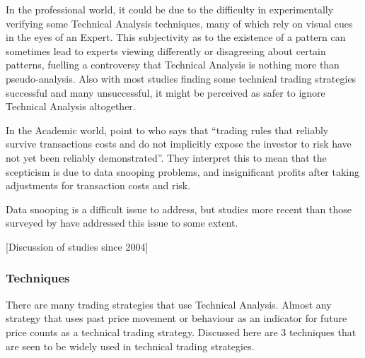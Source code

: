 \documentclass{article}
\theoremstyle{definition}
\begin{document}
In the professional world, it could be due to the difficulty in experimentally verifying some Technical Analysis techniques, many of which rely on visual cues in the eyes of an Expert. This subjectivity as to the existence of a pattern can sometimes lead to experts viewing differently or disagreeing about certain patterns, fuelling a controversy that Technical Analysis is nothing more than pseudo-analysis. Also with most studies finding some technical trading strategies successful and many unsuccessful, it might be perceived as safer to ignore Technical Analysis altogether.

In the Academic world, \cite{taprofitability} point to \cite{assetpricing} who says that ``trading rules that reliably survive transactions costs and do not implicitly expose the investor to risk have not yet been reliably demonstrated''. They interpret this to mean that the scepticism is due to data snooping problems, and insignificant profits after taking adjustments for transaction costs and risk.

Data snooping is a difficult issue to address, but studies more recent than those surveyed by \cite{taprofitability} have addressed this issue to some extent.

[Discussion of studies since 2004]

\subsubsection{Techniques}

There are many trading strategies that use Technical Analysis. Almost any strategy that uses past price movement or behaviour as an indicator for future price counts as a technical trading strategy. Discussed here are 3 techniques that are seen to be widely used in technical trading strategies.
\end{document}
